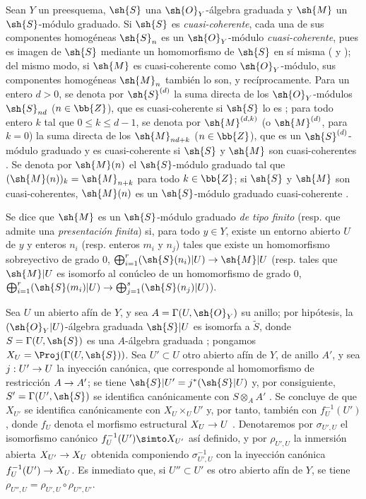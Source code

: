 \documentclass[oneside,10pt]{amsart}
\makeatletter
\renewcommand{\leq}{\leqslant}
\newcommand{\ega@arrow}[2]{\mathchoice{#1}{#2}{#2}{#2}}
\renewcommand{\to}{\ega@arrow{\longrightarrow}{\rightarrow}}
\newcommand{\oldpage}[2][]{\marginnote{\normalfont\footnotesize\textbf{#1}~|~#2}\ignorespaces}
\let\EGAOriginalLabel\label
\renewcommand{\label}[1]{\phantomsection\EGAOriginalLabel{#1}}
\makeatother
\begin{document}
\begin{env}[3.1.1]
\label{II.3.1.1}
Sean $Y$ un preesquema, $\sh{S}$ una $\sh{O}_Y$-álgebra graduada y $\sh{M}$ un $\sh{S}$-módulo graduado.
Si $\sh{S}$ es \emph{cuasi-coherente}, cada una de sus componentes homogéneas $\sh{S}_n$ es un $\sh{O}_Y$-módulo \emph{cuasi-coherente}, pues es imagen de $\sh{S}$ mediante un homomorfismo de $\sh{S}$ en sí misma ( y ); del mismo modo, si $\sh{M}$ es cuasi-coherente como $\sh{O}_Y$-módulo, sus componentes homogéneas $\sh{M}_n$ también lo son, y recíprocamente.
Para un entero $d>0$, se denota por $\sh{S}^{(d)}$ la suma directa de los $\sh{O}_Y$-módulos $\sh{S}_{nd}$ ($n\in\bb{Z}$), que es cuasi-coherente si $\sh{S}$ lo es ; para todo entero $k$ tal que $0\leq k\leq d-1$, se denota por $\sh{M}^{(d,k)}$ (o $\sh{M}^{(d)}$, para $k=0$) la suma directa de los $\sh{M}_{nd+k}$ ($n\in\bb{Z}$), que es un $\sh{S}^{(d)}$-módulo graduado y es cuasi-coherente si $\sh{S}$ y $\sh{M}$ son cuasi-coherentes .
Se denota por $\sh{M}(n)$ el $\sh{S}$-módulo graduado tal que $(\sh{M}(n))_k=\sh{M}_{n+k}$ para todo $k\in\bb{Z}$; si $\sh{S}$ y $\sh{M}$ son cuasi-coherentes, $\sh{M}(n)$ es un $\sh{S}$-módulo graduado cuasi-coherente .

Se dice que $\sh{M}$ es un $\sh{S}$-módulo graduado \emph{de tipo finito} (resp. que admite una \emph{presentación finita}) si, para todo $y\in Y$, existe un entorno abierto $U$ de $y$ y enteros $n_i$ (resp. enteros $m_i$ y $n_j$) tales que existe un homomorfismo sobreyectivo de grado $0$, $\bigoplus_{i=1}^r(\sh{S}(n_i)|U)\to\sh{M}|U$ (resp. tales que $\sh{M}|U$ es isomorfo al conúcleo de un homomorfismo de grado $0$, $\bigoplus_{i=1}^r(\sh{S}(m_i)|U)\to\bigoplus_{j=1}^s(\sh{S}(n_j)|U)$).

Sea $U$ un abierto afín de $Y$, y sea $A=\Gamma(U,\sh{O}_Y)$ su anillo; por hipótesis, la $(\sh{O}_Y|U)$-álgebra graduada $\sh{S}|U$ es isomorfa a $\widetilde{S}$, donde $S=\Gamma(U,\sh{S})$ es una $A$-álgebra graduada ;
\oldpage[II]{50}
pongamos $X_U=\Proj(\Gamma(U,\sh{S}))$.
Sea $U'\subset U$ otro abierto afín de $Y$, de anillo $A'$, y sea $j:U'\to U$ la inyección canónica, que corresponde al homomorfismo de restricción $A\to A'$; se tiene $\sh{S}|U'=j^*(\sh{S}|U)$ y, por consiguiente, $S'=\Gamma(U',\sh{S})$ se identifica canónicamente con $S\otimes_AA'$ .
Se concluye de  que $X_{U'}$ se identifica canónicamente con $X_U\times_U U'$ y, por tanto, también con $f_U^{-1}(U')$, donde $f_U$ denota el morfismo estructural $X_U\to U$ .
Denotaremos por $\sigma_{U',U}$ el isomorfismo canónico $f_U^{-1}(U')\simto X_{U'}$ así definido, y por $\rho_{U',U}$ la inmersión abierta $X_{U'}\to X_U$ obtenida componiendo $\sigma_{U',U}^{-1}$ con la inyección canónica $f_U^{-1}(U')\to X_U$.
Es inmediato que, si $U''\subset U'$ es otro abierto afín de $Y$, se tiene $\rho_{U'',U}=\rho_{U',U}\circ\rho_{U'',U'}$.
\end{env}
\end{document}
